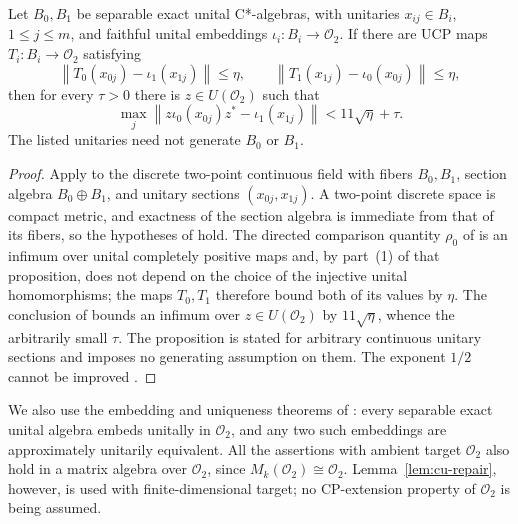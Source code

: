\begin{lemma}\label{lem:cu-kp}
 Let $B_0,B_1$ be separable exact unital C*-algebras, with
unitaries $x_{ij}\in B_i$, $1\leq j\leq m$, and faithful unital embeddings $\iota_i:B_i\to\mathcal{O}_2$. If there are UCP maps $T_i:B_i\to\mathcal{O}_2$
satisfying 
\begin{equation*}
\left\|T_0(x_{0j})-\iota_1(x_{1j})\right\|\leq\eta,\qquad
\left\|T_1(x_{1j})-\iota_0(x_{0j})\right\|\leq\eta,
\end{equation*}
then for every $\tau>0$ there is $z\in U(\mathcal{O}_2)$ such that 
\begin{equation*}
\max_j\left\|z\iota_0(x_{0j})z^*-\iota_1(x_{1j})\right\| <11\sqrt\eta+\tau.
\end{equation*}
The listed unitaries need not generate $B_0$ or $B_1$.
\end{lemma}

\begin{proof}
Apply \cite[Proposition 1.13]{KirchbergPhillipsFields2000} to the discrete two-point continuous
field with fibers $B_0,B_1$, section algebra $B_0\oplus B_1$, and unitary
sections $(x_{0j},x_{1j})$. A two-point discrete space is compact metric,
and exactness of the section algebra is immediate from that of its fibers,
so the hypotheses of \cite[Lemma 1.10]{KirchbergPhillipsFields2000} hold. The directed
comparison quantity $\rho_0$ of \cite[Proposition 1.11]{KirchbergPhillipsFields2000} is an
infimum over unital completely positive maps and, by part~(1) of that
proposition, does not depend on the choice of the injective unital
homomorphisms; the maps $T_0,T_1$ therefore bound both of its values by $\eta $. The conclusion of \cite[Proposition 1.13]{KirchbergPhillipsFields2000} bounds an
infimum over $z\in U(\mathcal{O}_2)$ by $11\sqrt\eta$, whence the
arbitrarily small $\tau$. The proposition is stated for arbitrary continuous
unitary sections and imposes no generating assumption on them. The exponent $1/2$ cannot be improved \cite[Remark 3.11]{KirchbergPhillipsFields2000}.
\end{proof}

We also use the embedding and uniqueness theorems of \cite{KirchbergPhillips2000}: every
separable exact unital algebra embeds unitally in $\mathcal{O}_2$, and any
two such embeddings are approximately unitarily equivalent. All the
assertions with ambient target $\mathcal{O}_2$ also hold in a matrix algebra
over $\mathcal{O}_2$, since $M_k(\mathcal{O}_2)\cong\mathcal{O}_2$. Lemma~\ref{lem:cu-repair}, however, is used with finite-dimensional target; no
CP-extension property of $\mathcal{O}_2$ is being assumed.


